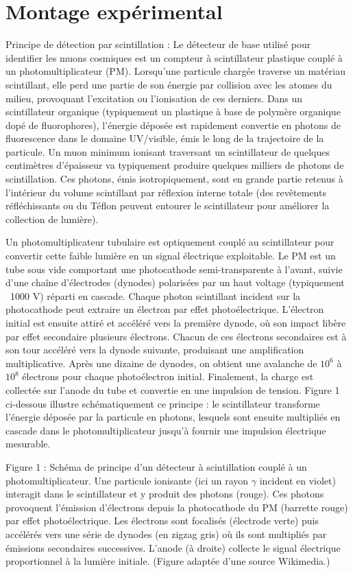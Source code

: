 \documentclass[a4paper,12pt,twoside]{article}
\begin{document}
\section{Montage expérimental}
Principe de détection par scintillation : Le détecteur de base utilisé pour identifier les muons cosmiques est un compteur à scintillateur plastique couplé à un photomultiplicateur (PM). Lorsqu’une particule chargée traverse un matériau scintillant, elle perd une partie de son énergie par collision avec les atomes du milieu, provoquant l’excitation ou l’ionisation de ces derniers. Dans un scintillateur organique (typiquement un plastique à base de polymère organique dopé de fluorophores), l’énergie déposée est rapidement convertie en photons de fluorescence dans le domaine UV/visible, émis le long de la trajectoire de la particule. Un muon minimum ionisant traversant un scintillateur de quelques centimètres d’épaisseur va typiquement produire quelques milliers de photons de scintillation. Ces photons, émis isotropiquement, sont en grande partie retenus à l’intérieur du volume scintillant par réflexion interne totale (des revêtements réfléchissants ou du Téflon peuvent entourer le scintillateur pour améliorer la collection de lumière).

Un photomultiplicateur tubulaire est optiquement couplé au scintillateur pour convertir cette faible lumière en un signal électrique exploitable. Le PM est un tube sous vide comportant une photocathode semi-transparente à l’avant, suivie d’une chaîne d’électrodes (dynodes) polarisées par un haut voltage (typiquement ~1000 V) réparti en cascade. Chaque photon scintillant incident sur la photocathode peut extraire un électron par effet photoélectrique. L’électron initial est ensuite attiré et accéléré vers la première dynode, où son impact libère par effet secondaire plusieurs électrons. Chacun de ces électrons secondaires est à son tour accéléré vers la dynode suivante, produisant une amplification multiplicative. Après une dizaine de dynodes, on obtient une avalanche de $10^6$ à $10^8$ électrons pour chaque photoélectron initial. Finalement, la charge est collectée sur l’anode du tube et convertie en une impulsion de tension. Figure 1 ci-dessous illustre schématiquement ce principe : le scintillateur transforme l’énergie déposée par la particule en photons, lesquels sont ensuite multipliés en cascade dans le photomultiplicateur jusqu’à fournir une impulsion électrique mesurable.

Figure 1 : Schéma de principe d’un détecteur à scintillation couplé à un photomultiplicateur. Une particule ionisante (ici un rayon $\gamma$ incident en violet) interagit dans le scintillateur et y produit des photons (rouge). Ces photons provoquent l’émission d’électrons depuis la photocathode du PM (barrette rouge) par effet photoélectrique. Les électrons sont focalisés (électrode verte) puis accélérés vers une série de dynodes (en zigzag gris) où ils sont multipliés par émissions secondaires successives. L’anode (à droite) collecte le signal électrique proportionnel à la lumière initiale. (Figure adaptée d’une source Wikimedia.)
\end{document}
